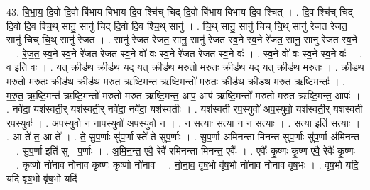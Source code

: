 \documentclass[17pt]{extarticle}
\begin{document}
43. बि॒भा॒य॒ दि॒वो दि॒वो बि॑भाय बिभाय दि॒व श्चि॑च् चिद् दि॒वो बि॑भाय बिभाय दि॒व श्चि॑त् । . दि॒व श्चि॑च् चिद् दि॒वो दि॒व श्चि॒थ् सानु॒ सानु॑ चिद् दि॒वो दि॒व श्चि॒थ् सानु॑ । . चि॒थ् सानु॒ सानु॑ चिच् चि॒थ् सानु॑ रेजत रेजत॒ सानु॑ चिच् चि॒थ् सानु॑ रेजत । . सानु॑ रेजत रेजत॒ सानु॒ सानु॑ रेजत स्व॒ने स्व॒ने रे॑जत॒ सानु॒ सानु॑ रेजत स्व॒ने । . रे॒ज॒त॒ स्व॒ने स्व॒ने रे॑जत रेजत स्व॒ने वो॑ वः स्व॒ने रे॑जत रेजत स्व॒ने वः॑ । . स्व॒ने वो॑ वः स्व॒ने स्व॒ने वः॑ । . व॒ इति॑ वः । . यत् क्रीड॑थ॒ क्रीड॑थ॒ यद् यत् क्रीड॑थ मरुतो मरुतः॒ क्रीड॑थ॒ यद् यत् क्रीड॑थ मरुतः । . क्रीड॑थ मरुतो मरुतः॒ क्रीड॑थ॒ क्रीड॑थ मरुत ऋष्टि॒मन्त॑ ऋष्टि॒मन्तो॑ मरुतः॒ क्रीड॑थ॒ क्रीड॑थ मरुत ऋष्टि॒मन्तः॑ । . म॒रु॒त॒ ऋ॒ष्टि॒मन्त॑ ऋष्टि॒मन्तो॑ मरुतो मरुत ऋष्टि॒मन्त॒ आप॒ आप॑ ऋष्टि॒मन्तो॑ मरुतो मरुत ऋष्टि॒मन्त॒ आपः॑ । . नवे॑दा॒ यश॑स्वती॒र् यश॑स्वती॒र् नवे॑दा॒ नवे॑दा॒ यश॑स्वतीः । . यश॑स्वती रप॒स्युवो॑ अप॒स्युवो॒ यश॑स्वती॒र् यश॑स्वती रप॒स्युवः॑ । . अ॒प॒स्युवो॒ न नाप॒स्युवो॑ अप॒स्युवो॒ न । . न स॒त्याः स॒त्या न न स॒त्याः । . स॒त्या इति॑ स॒त्याः । . आ ते॑ त॒ आ ते᳚ । . ते॒ सु॒प॒र्णाः सु॑प॒र्णा स्ते॑ ते सुप॒र्णाः । . सु॒प॒र्णा अ॑मिनन्ता मिनन्त सुप॒र्णाः सु॑प॒र्णा अ॑मिनन्त । . सु॒प॒र्णा इति॑ सु - प॒र्णाः । . अ॒मि॒न॒न्त॒ एवै॒ रेवै॑ रमिनन्ता मिनन्त॒ एवैः᳚ । . एवैः᳚ कृ॒ष्णः कृ॒ष्ण एवै॒ रेवैः᳚ कृ॒ष्णः । . कृ॒ष्णो नो॑नाव नोनाव कृ॒ष्णः कृ॒ष्णो नो॑नाव । . नो॒ना॒व॒ वृ॒ष॒भो वृ॑ष॒भो नो॑नाव नोनाव वृष॒भः । . वृ॒ष॒भो यदि॒ यदि॑ वृष॒भो वृ॑ष॒भो यदि॑ । \newline
\end{document}
